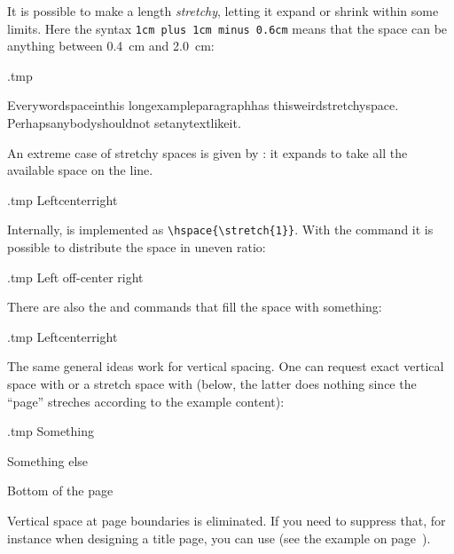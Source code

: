 It is possible to make a length \emph{stretchy},
letting it expand or shrink within some limits.
Here the syntax \texttt{1cm plus 1cm minus 0.6cm} means that
the space can be anything between 0.4~cm and 2.0~cm:
%
\begin{VerbatimOut}{\jobname.tmp}
\newcommand\spa
  {\hspace{1cm plus 1cm minus 0.6cm}}

Every\spa word\spa space\spa in\spa this\spa
long\spa example\spa paragraph\spa has\spa
this\spa weird\spa stretchy\spa space.
Perhaps\spa anybody\spa should\spa not\spa
set\spa any\spa text\spa like\spa it.
\end{VerbatimOut}
\ShowExample

An extreme case of stretchy spaces is given by :
it expands to take all the available space on the line.
%
\begin{VerbatimOut}{\jobname.tmp}
Left\hfill center\hfill right
\end{VerbatimOut}
\ShowExampleBelow
%
Internally,  is implemented as \verb|\hspace{\stretch{1}}|.
With the  command it is possible to distribute the space in uneven ratio:
%
\begin{VerbatimOut}{\jobname.tmp}
Left off-center right
\end{VerbatimOut}
\ShowExampleBelow

There are also the  and  commands
that fill the space with something:
%
\begin{VerbatimOut}{\jobname.tmp}
Left\hrulefill center\dotfill right
\end{VerbatimOut}
\ShowExampleBelow

The same general ideas work for vertical spacing.
One can request exact vertical space with  or a stretch space with 
(below, the latter does nothing since the ``page'' streches according to the example content):
%
\begin{VerbatimOut}{\jobname.tmp}
Something

\vspace{1cm}

Something else

\vfill

Bottom of the page
\end{VerbatimOut}
\ShowExample
%
Vertical space at page boundaries is eliminated.
If you need to suppress that, for instance when designing a title page,
you can use  (see the example on page~\pageref{ex:titlepage}).

